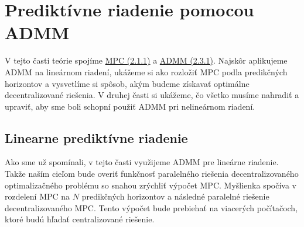 \section{Prediktívne riadenie pomocou ADMM}
\label{se:MPC_ADMM}
V tejto časti teórie spojíme \hyperref[subse:MPC]{MPC (2.1.1)} a \hyperref[subse:ADMM]{ADMM (2.3.1)}. Najskôr aplikujeme ADMM na lineárnom riadení, ukážeme si ako rozložiť MPC podla predikčných horizontov a vysvetlíme si spôsob, akým budeme získavať optimálne decentralizované riešenia. V druhej časti si ukážeme, čo všetko musíme nahradiť a upraviť, aby sme boli schopní použiť ADMM pri nelineárnom riadení. 

\subsection{Linearne prediktívne riadenie}
\label{subse:Lin_MPC_ADMM}
Ako sme už spomínali, v tejto časti využijeme ADMM pre lineárne riadenie. Takže naším cieľom bude overiť funkčnosť paralelného riešenia decentralizovaného optimalizačného problému so snahou zrýchliť výpočet MPC. Myšlienka spočíva v rozdelení MPC na $N$ predikčných horizontov a následné paralelné riešenie decentralizovaného MPC. Tento výpočet bude prebiehať na viacerých počítačoch, ktoré budú hľadať centralizované riešenie. 

